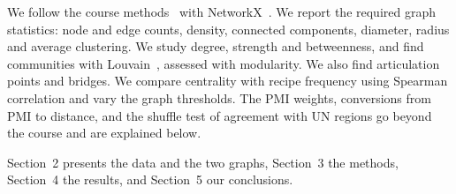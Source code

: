 We follow the course methods~\cite{quercini2026} with
NetworkX~\cite{hagberg2008}. We report the required graph statistics:
node and edge counts, density, connected components, diameter, radius
and average clustering. We study degree, strength and betweenness, and
find communities with Louvain~\cite{blondel2008}, assessed with modularity.
We also find articulation points and bridges. We compare centrality
with recipe frequency using Spearman correlation and vary the graph thresholds.
The PMI weights, conversions from PMI to distance, and the shuffle test of
agreement with UN regions go beyond the course and are explained below.

Section~2 presents the data and the two graphs, Section~3 the methods, Section~4 the results, and Section~5 our conclusions.
